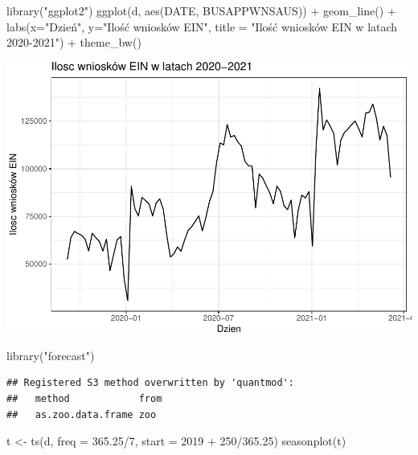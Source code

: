 \documentclass[
  polish,
]{article}
\newenvironment{Shaded}{\begin{snugshade}}{\end{snugshade}}
\newcommand{\AttributeTok}[1]{\textcolor[rgb]{0.77,0.63,0.00}{#1}}
\newcommand{\DecValTok}[1]{\textcolor[rgb]{0.00,0.00,0.81}{#1}}
\newcommand{\FloatTok}[1]{\textcolor[rgb]{0.00,0.00,0.81}{#1}}
\newcommand{\FunctionTok}[1]{\textcolor[rgb]{0.00,0.00,0.00}{#1}}
\newcommand{\NormalTok}[1]{#1}
\newcommand{\OtherTok}[1]{\textcolor[rgb]{0.56,0.35,0.01}{#1}}
\newcommand{\SpecialCharTok}[1]{\textcolor[rgb]{0.00,0.00,0.00}{#1}}
\newcommand{\StringTok}[1]{\textcolor[rgb]{0.31,0.60,0.02}{#1}}
\begin{document}
\begin{Shaded}
\begin{Highlighting}[]
\FunctionTok{library}\NormalTok{(}\StringTok{"ggplot2"}\NormalTok{)}
\FunctionTok{ggplot}\NormalTok{(d, }\FunctionTok{aes}\NormalTok{(DATE, BUSAPPWNSAUS)) }\SpecialCharTok{+}
  \FunctionTok{geom\_line}\NormalTok{() }\SpecialCharTok{+}
  \FunctionTok{labs}\NormalTok{(}\AttributeTok{x=}\StringTok{"Dzień"}\NormalTok{, }\AttributeTok{y=}\StringTok{"Ilość wniosków EIN"}\NormalTok{, }\AttributeTok{title =} \StringTok{"Ilość wniosków EIN w latach 2020{-}2021"}\NormalTok{) }\SpecialCharTok{+}
  \FunctionTok{theme\_bw}\NormalTok{()}
\end{Highlighting}
\end{Shaded}

\includegraphics{Analiza_files/figure-latex/unnamed-chunk-3-1.pdf}

\begin{Shaded}
\begin{Highlighting}[]
\FunctionTok{library}\NormalTok{(}\StringTok{"forecast"}\NormalTok{)}
\end{Highlighting}
\end{Shaded}

\begin{verbatim}
## Registered S3 method overwritten by 'quantmod':
##   method            from
##   as.zoo.data.frame zoo
\end{verbatim}

\begin{Shaded}
\begin{Highlighting}[]
\NormalTok{t }\OtherTok{\textless{}{-}} \FunctionTok{ts}\NormalTok{(d, }\AttributeTok{freq =} \FloatTok{365.25}\SpecialCharTok{/}\DecValTok{7}\NormalTok{, }\AttributeTok{start =}  \DecValTok{2019} \SpecialCharTok{+} \DecValTok{250}\SpecialCharTok{/}\FloatTok{365.25}\NormalTok{)}
\FunctionTok{seasonplot}\NormalTok{(t)}
\end{Highlighting}
\end{Shaded}
\end{document}

